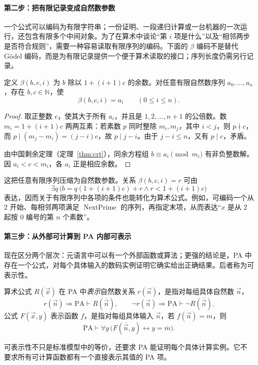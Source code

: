 \documentclass[lang=cn,a4paper,fontset=none,zihao=false,10pt,openany,twoside]{beautybook}
\numberwithin{algorithm}{chapter}
\newcommand{\N}{\mathbb N}
\begin{document}
\paragraph{第二步：把有限记录变成自然数参数}
一个公式可以编码为有限字符串；一份证明、一段递归计算或一台机器的一次运行，还包含有限多个中间对象。为了在算术中谈论“第 $i$ 项是什么”以及“相邻两步是否符合规则”，需要一种容易读取有限序列的编码。下面的 $\beta$ 编码不是替代 Gödel 编码，而是为有限记录提供一个便于算术读取的接口；序列长度仍需另行记录。

\begin{lemma}[有限序列的余数编码]\label{lem:beta-code}
定义 $\beta(b,c,i)$ 为 $b$ 除以 $1+(i+1)c$ 的余数。对任意有限自然数序列 $a_0,\ldots,a_n$，存在 $b,c\in\N$，使
\[
 \beta(b,c,i)=a_i\qquad(0\leq i\leq n).
\]
\end{lemma}
\begin{proof}
取正整数 $c$，使其大于所有 $a_i$，并且是 $1,2,\ldots,n+1$ 的公倍数。数 $m_i=1+(i+1)c$ 两两互素：若素数 $p$ 同时整除 $m_i,m_j$，其中 $i<j$，则 $p\nmid c$，而 $p\mid(m_j-m_i)=(j-i)c$，故 $p\mid j-i$。由于 $j-i\leq n$，又有 $p\mid c$，矛盾。

由中国剩余定理（定理~\ref{thm:crt}），同余方程组 $b\equiv a_i\pmod{m_i}$ 有非负整数解。因 $a_i<c<m_i$，各 $a_i$ 正是相应余数。
\end{proof}
这把任意有限序列压缩为自然数参数。关系 $\beta(b,c,i)=r$ 可由
\[
 \exists q\,\bigl(b=q(1+(i+1)c)+r\wedge r<1+(i+1)c\bigr)
\]
表达，因而关于有限序列中各项的条件也能转化为算术公式。例如，可编码一个从 $2$ 开始、每相邻两项满足 $\operatorname{NextPrime}$ 的序列，再指定末项，从而表达“$x$ 是从 $2$ 起按 $0$ 编号的第 $n$ 个素数”。

\paragraph{第三步：从外部可计算到 PA 内部可表示}
现在区分两个层次：元语言中可以有一个外部函数或算法；更强的结论是，PA 中存在一个公式，对每个具体输入的数码实例证明它确实给出正确结果。后者称为可表示性。

\begin{definition}[可表示性]
算术公式 $R(\vec x)$ 在 PA 中\emph{表示}自然数关系 $r(\vec n)$，是指对每组具体自然数 $\vec n$，
\[
 r(\vec n)\Rightarrow\mathrm{PA}\vdash R(\overline{\vec n}),
 \qquad
 \neg r(\vec n)\Rightarrow\mathrm{PA}\vdash\neg R(\overline{\vec n}).
\]
公式 $F(\vec x,y)$ 表示函数 $f$，是指对每组具体输入 $\vec n$，若 $f(\vec n)=m$，则
\[
 \mathrm{PA}\vdash\forall y\,
 \bigl(F(\overline{\vec n},y)\leftrightarrow y=\overline m\bigr).
\]
\end{definition}
可表示性不只是标准模型中的等价，还要求 PA 能证明每个具体计算实例。它不要求所有可计算函数都有一个直接表示其值的 PA 项。
\end{document}
